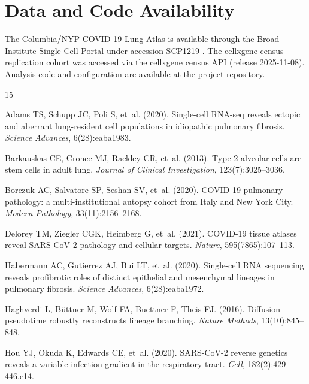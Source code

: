 \documentclass[11pt,a4paper]{article}
\begin{document}
\section{Data and Code Availability}

The Columbia/NYP COVID-19 Lung Atlas is available through the Broad Institute
Single Cell Portal under accession SCP1219 \citep{Melms2021}. The cellxgene census
replication cohort was accessed via the cellxgene census API (release 2025-11-08).
Analysis code and configuration are available at the project repository.

\begin{thebibliography}{15}

Adams TS, Schupp JC, Poli S, et~al. (2020).
\newblock Single-cell RNA-seq reveals ectopic and aberrant lung-resident cell populations in idiopathic pulmonary fibrosis.
\newblock \textit{Science Advances}, 6(28):eaba1983.

Barkauskas CE, Cronce MJ, Rackley CR, et~al. (2013).
\newblock Type 2 alveolar cells are stem cells in adult lung.
\newblock \textit{Journal of Clinical Investigation}, 123(7):3025--3036.

Borczuk AC, Salvatore SP, Seshan SV, et~al. (2020).
\newblock COVID-19 pulmonary pathology: a multi-institutional autopsy cohort from Italy and New York City.
\newblock \textit{Modern Pathology}, 33(11):2156--2168.

Delorey TM, Ziegler CGK, Heimberg G, et~al. (2021).
\newblock COVID-19 tissue atlases reveal SARS-CoV-2 pathology and cellular targets.
\newblock \textit{Nature}, 595(7865):107--113.

Habermann AC, Gutierrez AJ, Bui LT, et~al. (2020).
\newblock Single-cell RNA sequencing reveals profibrotic roles of distinct epithelial and mesenchymal lineages in pulmonary fibrosis.
\newblock \textit{Science Advances}, 6(28):eaba1972.

Haghverdi L, B{\"u}ttner M, Wolf FA, Buettner F, Theis FJ. (2016).
\newblock Diffusion pseudotime robustly reconstructs lineage branching.
\newblock \textit{Nature Methods}, 13(10):845--848.

Hou YJ, Okuda K, Edwards CE, et~al. (2020).
\newblock SARS-CoV-2 reverse genetics reveals a variable infection gradient in the respiratory tract.
\newblock \textit{Cell}, 182(2):429--446.e14.


\end{thebibliography}
\end{document}
